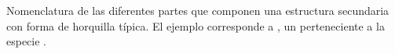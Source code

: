 \label{fig:hairpin-parts} Nomenclatura de las diferentes partes que
componen una estructura secundaria con forma de horquilla típica.
El ejemplo corresponde a \protect{}, un \premirna{}
perteneciente a la especie \protect\footnotemark.
